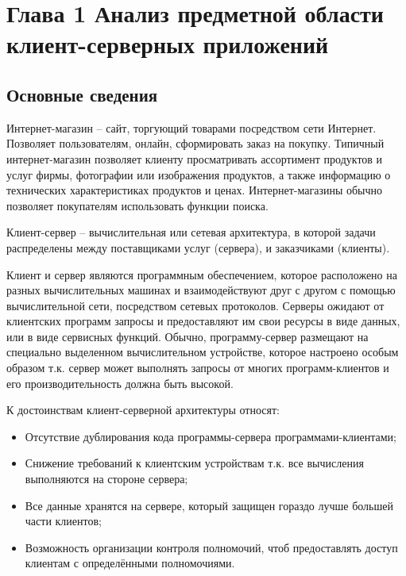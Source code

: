 \section[Глава 1 Анализ предметной области клиент-серверных приложений]{Глава 1 \break Анализ предметной области клиент-серверных приложений}
\label{sec:charpter-1-analisis}

\subsection{Основные сведения}\label{subsec:1-common-info}\indent

Интернет-магазин – сайт, торгующий товарами посредством сети Интернет.
Позволяет пользователям, онлайн, сформировать заказ на покупку.
Типичный интернет-магазин позволяет клиенту просматривать ассортимент продуктов и услуг фирмы, фотографии или изображения продуктов, а также информацию о технических характеристиках продуктов и ценах.
Интернет-магазины обычно позволяет покупателям использовать функции поиска.

Клиент-сервер – вычислительная или сетевая архитектура, в которой задачи распределены между поставщиками услуг (сервера), и заказчиками (клиенты).

Клиент и сервер являются программным обеспечением, которое расположено на разных вычислительных машинах и взаимодействуют друг с другом с помощью вычислительной сети, посредством сетевых протоколов.
Серверы ожидают от клиентских программ запросы и предоставляют им свои ресурсы в виде данных, или в виде сервисных функций.
Обычно, программу-сервер размещают на специально выделенном вычислительном устройстве, которое настроено особым образом т.к. сервер может выполнять запросы от многих программ-клиентов и его производительность должна быть высокой.

К достоинствам клиент-серверной архитектуры относят:

\begin{itemize}
    \item Отсутствие дублирования кода программы-сервера программами-клиентами;
    \item Снижение требований к клиентским устройствам т.к. все вычисления выполняются на стороне сервера;
    \item Все данные хранятся на сервере, который защищен гораздо лучше большей части клиентов;
    \item Возможность организации контроля полномочий, чтоб предоставлять доступ клиентам с определёнными полномочиями.
\end{itemize}

